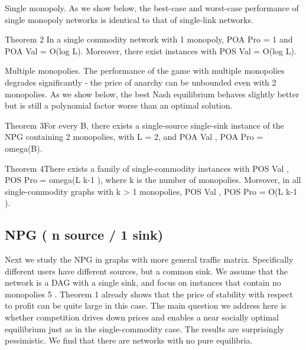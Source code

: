 \documentclass{beamer}
\begin{document}
\begin{frame}
Single monopoly. As we show below, the best-case and worst-case performance
of single monopoly networks is identical to that of single-link networks.


\begin{block}{Theorem 2}
In a single commodity network with 1 monopoly, POA Pro = 1 and
POA Val = O(log L). Moreover, there exist instances with POS Val = O(log L).
\end{block}
\end{frame}

\begin{frame}
Multiple monopolies. The performance of the game with multiple monopolies
degrades significantly - the price of anarchy can be unbounded even with 2
monopolies. As we show below, the best Nash equilibrium behaves slightly better
but is still a polynomial factor worse than an optimal solution.

\begin{block}{Theorem 3}For every B, there exists a single-source single-sink instance of
the NPG containing 2 monopolies, with L = 2, and POA Val , POA Pro = omega(B).
\end{block}

\begin{block}{Theorem 4}There exists a family of single-commodity instances with POS Val ,
POS Pro = omega(L k-1 ), where k is the number of monopolies. Moreover, in all
single-commodity graphs with k > 1 monopolies, POS Val , POS Pro = O(L k-1 ).
\end{block}
\end{frame}


\subsection{NPG ( n source / 1 sink)}


\begin{frame}
Next we study the NPG in graphs with more general traffic matrix. Specifically
different users have different sources, but a common sink. We assume that the
network is a DAG with a single sink, and focus on instances that contain no
monopolies 5 . Theorem 1 already shows that the price of stability with respect
to profit can be quite large in this case. The main question we address here
is whether competition drives down prices and enables a near socially optimal
equilibrium just as in the single-commodity case.
The results are surprisingly pessimistic. We find that there are networks with
no pure equilibria.
\end{frame}
\end{document}
